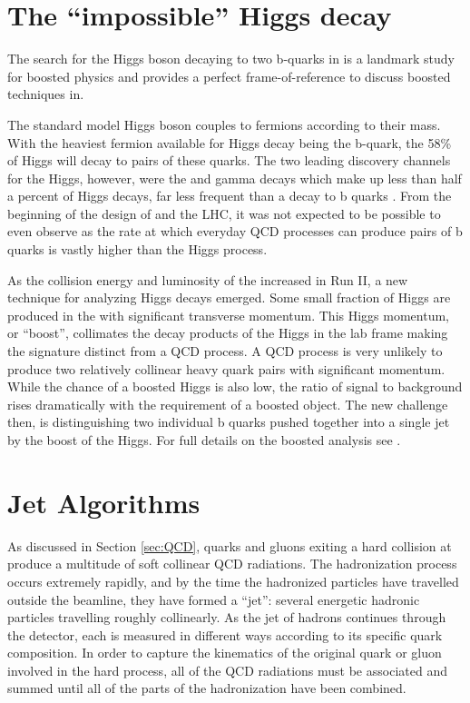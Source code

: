 \section{The ``impossible'' Higgs decay}
The search for the Higgs boson decaying to two b-quarks in \CMS is a landmark study for boosted physics and provides a perfect frame-of-reference to discuss boosted techniques in.

The standard model Higgs boson couples to fermions according to their mass. With the heaviest fermion available for Higgs decay being the b-quark, the 58\% of Higgs will decay to pairs of these quarks. The two leading discovery channels for the Higgs, however, were the \higgstoZZtollll and \higgstogammagamma gamma decays which make up less than half a percent of Higgs decays, far less frequent than a decay to b quarks \cite{pdg2018}. From the beginning of the design of \CMS and the LHC, it was not expected to be possible to even observe \higgstobb as the rate at which everyday QCD processes can produce pairs of b quarks is vastly higher than the Higgs process.

As the collision energy and luminosity of the \LHC increased in Run II, a new technique for analyzing Higgs decays emerged. Some small fraction of Higgs are produced in the \LHC with significant transverse momentum. This Higgs momentum, or ``boost'', collimates the decay products of the Higgs in the lab frame making the signature distinct from a QCD process. A QCD process is very unlikely to produce two relatively collinear heavy quark pairs with significant momentum. While the chance of a boosted Higgs is also low, the ratio of signal to background rises dramatically with the requirement of a boosted object. The new challenge then, is distinguishing two individual b quarks pushed together into a single jet by the boost of the Higgs. For full details on the boosted \higgstobb analysis see \cite{boostedHiggsTobb}.

\section{Jet Algorithms}
\label{sec:jetalgorithm}

As discussed in Section \ref{sec:QCD}, quarks and gluons exiting a hard collision at \CMS produce a multitude of soft collinear QCD radiations. The hadronization process occurs extremely rapidly, and by the time the hadronized particles have travelled outside the beamline, they have formed a ``jet'': several energetic hadronic particles travelling roughly collinearly. As the jet of hadrons continues through the detector, each is measured in different ways according to its specific quark composition. In order to capture the kinematics of the original quark or gluon involved in the hard process, all of the QCD radiations must be associated and summed until all of the parts of the hadronization have been combined.

